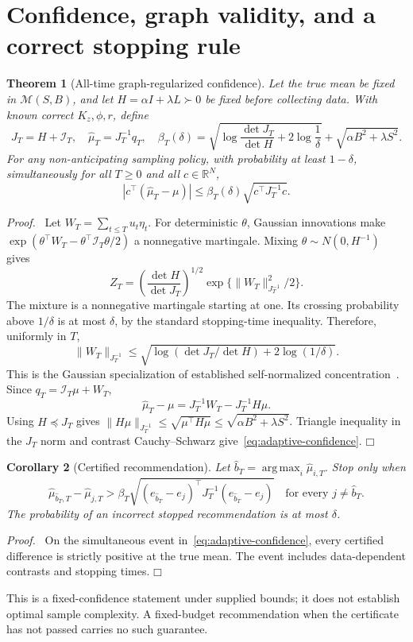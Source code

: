\documentclass[11pt]{article}
\newtheorem{theorem}{Theorem}
\newtheorem{corollary}[theorem]{Corollary}
\newenvironment{proof}{\par\noindent\textit{Proof.}\ }{\hfill$\mdlgwhtsquare$\par\medskip}
\newcommand{\argmax}{\operatorname*{arg\,max}}
\begin{document}
\section{Confidence, graph validity, and a correct stopping rule}
\begin{theorem}[All-time graph-regularized confidence]
Let the true mean be fixed in $\mathcal M(S,B)$, and let $H=\alpha I+\lambda L\succ0$ be fixed before collecting data. With known correct $K_z,\phi,r$, define
\begin{equation}
J_T=H+\mathcal I_T,\quad \widehat\mu_T=J_T^{-1}q_T,\quad
\beta_T(\delta)=\sqrt{\log\frac{\det J_T}{\det H}+2\log\frac1\delta}
+\sqrt{\alpha B^2+\lambda S^2}.
\label{eq:beta}
\end{equation}
For any non-anticipating sampling policy, with probability at least $1-\delta$, simultaneously for all $T\ge0$ and all $c\in\mathbb R^N$,
\begin{equation}
\boxed{|c^\top(\widehat\mu_T-\mu)|\le
\beta_T(\delta)\sqrt{c^\top J_T^{-1}c}.}
\label{eq:adaptive-confidence}
\end{equation}
\end{theorem}
\begin{proof}
Let $W_T=\sum_{t\le T}u_t\eta_t$. For deterministic $\theta$, Gaussian innovations make
$\exp(\theta^\top W_T-\theta^\top\mathcal I_T\theta/2)$ a nonnegative martingale. Mixing $\theta\sim N(0,H^{-1})$ gives
\[
Z_T=\left(\frac{\det H}{\det J_T}\right)^{1/2}
\exp\{\|W_T\|_{J_T^{-1}}^2/2\}.
\]
The mixture is a nonnegative martingale starting at one. Its crossing probability above $1/\delta$ is at most $\delta$, by the standard stopping-time inequality. Therefore, uniformly in $T$,
\[
\|W_T\|_{J_T^{-1}}\le
\sqrt{\log(\det J_T/\det H)+2\log(1/\delta)}.
\]
This is the Gaussian specialization of established self-normalized concentration~\cite{abbasi2011}. Since $q_T=\mathcal I_T\mu+W_T$,
\[
\widehat\mu_T-\mu=J_T^{-1}W_T-J_T^{-1}H\mu.
\]
Using $H\preceq J_T$ gives $\|H\mu\|_{J_T^{-1}}\le\sqrt{\mu^\top H\mu}\le\sqrt{\alpha B^2+\lambda S^2}$. Triangle inequality in the $J_T$ norm and contrast Cauchy--Schwarz give~\eqref{eq:adaptive-confidence}.
\end{proof}

\begin{corollary}[Certified recommendation]
Let $\widehat b_T=\argmax_i\widehat\mu_{i,T}$. Stop only when
\begin{equation}
\widehat\mu_{\widehat b_T,T}-\widehat\mu_{j,T}
>\beta_T\sqrt{(e_{\widehat b_T}-e_j)^\top J_T^{-1}(e_{\widehat b_T}-e_j)}
\quad\text{for every }j\ne\widehat b_T.
\label{eq:stop}
\end{equation}
The probability of an incorrect stopped recommendation is at most $\delta$.
\end{corollary}
\begin{proof}
On the simultaneous event in~\eqref{eq:adaptive-confidence}, every certified difference is strictly positive at the true mean. The event includes data-dependent contrasts and stopping times.
\end{proof}
This is a fixed-confidence statement under supplied bounds; it does not establish optimal sample complexity. A fixed-budget recommendation when the certificate has not passed carries no such guarantee.
\end{document}

